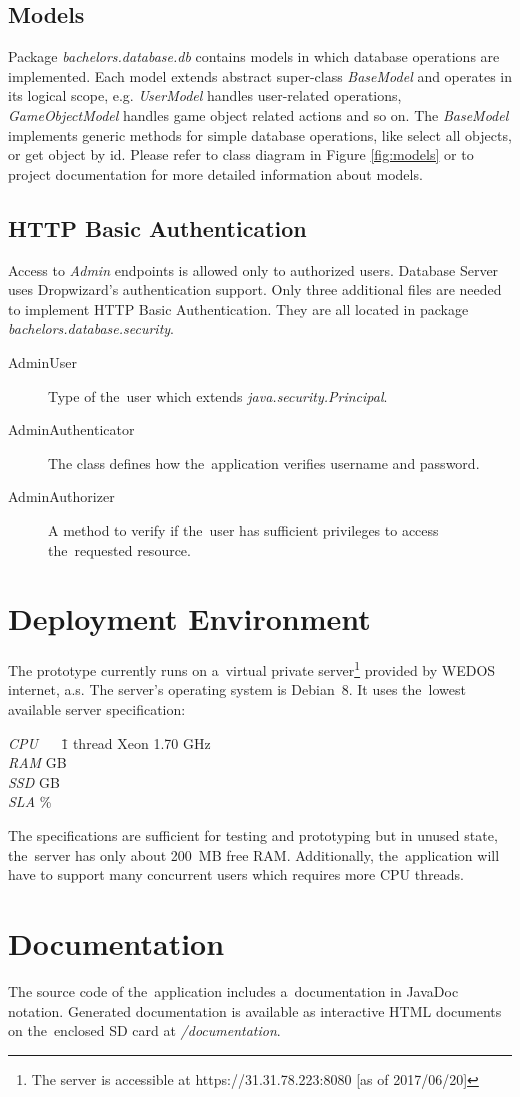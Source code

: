 \subsection{Models}
Package \textit{bachelors.database.db} contains models in which database operations are implemented. Each model extends abstract super-class \textit{BaseModel} and operates in its logical scope, e.g. \textit{UserModel} handles user-related operations, \textit{GameObjectModel} handles game object related actions and so on. The \textit{BaseModel} implements generic methods for simple database operations, like select all objects, or get object by id. Please refer to class diagram in Figure \ref{fig:models} or to project documentation for more detailed information about models.

\subsection{HTTP Basic Authentication} 
Access to \textit{Admin} endpoints is allowed only to authorized users. Database Server uses Dropwizard's authentication support. Only three additional files are needed to implement HTTP Basic Authentication. They are all located in package \textit{bachelors.database.security}. 
\begin{description}
	\item[AdminUser] Type of the~user which extends \textit{java.security.Principal}.
	\item[AdminAuthenticator] The class defines how the~application verifies username and password.
	\item[AdminAuthorizer] A method to verify if the~user has sufficient privileges to access the~requested resource.
\end{description}

\section{Deployment Environment}
\label{section:deploy}
The prototype currently runs on a~virtual private server\footnote{The server is accessible at https://31.31.78.223:8080 [as of 2017/06/20]} provided by WEDOS internet, a.s. The server's operating system is Debian~8. It uses the~lowest available server specification:
\begin{tabbing}
	\textit{CPU} ~~ \= 1 thread Xeon 1.70 GHz\\
	\textit{RAM}  GB\\
	\textit{SSD}  GB\\
	\textit{SLA} \%
\end{tabbing}

The specifications are sufficient for testing and prototyping but in unused state, the~server has only about 200~MB free RAM. Additionally, the~application will have to support many concurrent users which requires more CPU threads.  

\section{Documentation}
The source code of the~application includes a~documentation in JavaDoc notation. Generated documentation is available as interactive HTML documents on the~enclosed SD card at \textit{/documentation}.